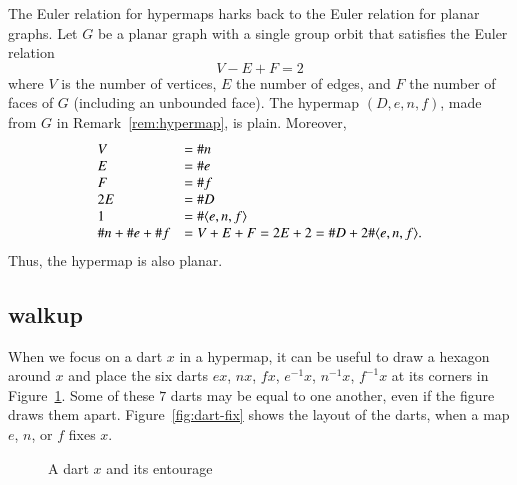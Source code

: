 \begin{remark}  The Euler relation for hypermaps harks back
to the Euler relation for planar graphs.
Let $G$ be a planar graph with a single group orbit that satisfies the
Euler relation
    $$V - E + F = 2$$
where $V$ is the number of vertices, $E$ the number of edges, and
$F$ the number of faces of $G$ (including an unbounded face). The
hypermap $(D,e,n,f)$, made from $G$ in
Remark~\ref{rem:hypermap}, is plain.
Moreover,
    $$\begin{array}{lll}
    V &= \# n\\
    E &= \# e\\
    F &= \# f\\
    2E &= \# D\\
    1 &= \#\langle e,n,f\rangle\\
    \# n + \#e + \# f &= 
    V + E + F = 2 E + 2 = \# D + 2 \#\langle e,n,f\rangle.
    \end{array}
    $$
Thus, the hypermap is also planar. 
\end{remark}


%
%


\subsection{walkup}

When we focus on a dart $x$ in a
hypermap, it can be useful to draw a hexagon around $x$ and place
the six darts $e x$,
$n x$, $f x$, $e^{-1} x$, $n^{-1} x$, $f^{-1} x$ at its corners
in Figure~\ref{fig:dart+}.  Some of these $7$ darts may be
equal to one another, even if the figure draws them apart.
Figure~\ref{fig:dart-fix} shows the layout of the darts, when 
a map $e$, $n$, or $f$ fixes $x$.

\begin{figure}[htb]
  \centering
  \caption{A dart $x$ and its entourage}
  \label{fig:dart+}
\end{figure}

